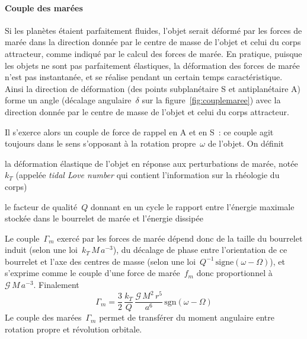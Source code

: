 

\sk
\paragraph{Couple des marées} Si les planètes étaient parfaitement fluides, l'objet serait déformé par les forces de marée dans la direction donnée par le centre de masse de l'objet et celui du corps attracteur, comme indiqué par le calcul des forces de marée. En pratique, puisque les objets ne sont pas parfaitement élastiques, la déformation des forces de marée n'est pas instantanée, et se réalise pendant un certain temps caractéristique. Ainsi la direction de déformation (des points subplanétaire S et antiplanétaire A) forme un angle (décalage angulaire~$\delta$ sur la figure~\ref{fig:couplemaree}) avec la direction donnée par le centre de masse de l'objet et celui du corps attracteur. 

\sk
Il s'exerce alors un couple de force de rappel en A et en S~: ce couple agit toujours dans le sens s'opposant à la rotation propre~$\omega$ de l'objet. On définit 
\begin{citemize}
\item la déformation élastique de l'objet en réponse aux perturbations de marée, notée $k_T$ (appelée \emph{tidal Love number} qui contient l'information sur la rhéologie du corps)
\item le facteur de qualité~$Q$ donnant en un cycle le rapport entre l'énergie maximale stockée dans le bourrelet de marée et l'énergie dissipée  
\end{citemize}
\noindent Le couple~$\Gamma_m$ exercé par les forces de marée dépend donc de la taille du bourrelet induit (selon une loi~$k_T \, M \, a^{-3}$), du décalage de phase entre l'orientation de ce bourrelet et l'axe des centres de masse (selon une loi~$Q^{-1}\,\textrm{signe}(\omega-\Omega)$), et s'exprime comme le couple d'une force de marée~$f_m$ donc proportionnel à~$\mathcal{G}\,M\,a^{-3}$. Finalement
\[ \Gamma_m = \frac{3}{2} \, \frac{k_T}{Q} \, \frac{\mathcal{G}\,M^2\,r^5}{a^6} \, \textrm{sgn}(\omega-\Omega) \]
\noindent Le couple des marées~$\Gamma_m$ permet de transférer du moment angulaire entre rotation propre et révolution orbitale.

\sk
